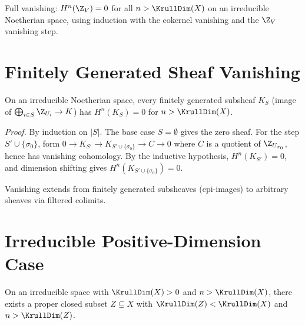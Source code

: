 \begin{theorem}\label{thm:zeroOutsideInt_cohomology_vanishing}
  \leanok
  Full vanishing: $H^n(\Z_V) = 0$ for all $n > \KrullDim(X)$ on an
  irreducible Noetherian space, using induction with the cokernel
  vanishing and the $\Z_V$ vanishing step.
\end{theorem}


\chapter{Finitely Generated Sheaf Vanishing}\label{ch:fingen}

\begin{theorem}\label{thm:finsetGeneratedSheaf_vanishing}
  \leanok
  On an irreducible Noetherian space, every finitely generated subsheaf $K_S$
  (image of $\bigoplus_{i \in S} \Z_{U_i} \to K$) has $H^n(K_S) = 0$ for
  $n > \KrullDim(X)$.

  \emph{Proof.} By induction on $|S|$. The base case $S = \emptyset$ gives the
  zero sheaf. For the step $S' \cup \{\sigma_0\}$, form
  $0 \to K_{S'} \to K_{S' \cup \{\sigma_0\}} \to C \to 0$
  where $C$ is a quotient of $\Z_{U_{\sigma_0}}$, hence has vanishing cohomology.
  By the inductive hypothesis, $H^n(K_{S'}) = 0$, and dimension shifting gives
  $H^n(K_{S' \cup \{\sigma_0\}}) = 0$.
\end{theorem}

\begin{theorem}\label{thm:directLimit_cohomology_vanishing}
  \leanok
  Vanishing extends from finitely generated subsheaves (epi-images)
  to arbitrary sheaves via filtered colimits.
\end{theorem}


\chapter{Irreducible Positive-Dimension Case}\label{ch:irredpos}

\begin{lemma}\label{lem:exists_closed_subset}
  \leanok
  On an irreducible space with $\KrullDim(X) > 0$ and $n > \KrullDim(X)$,
  there exists a proper closed subset $Z \subsetneq X$ with $\KrullDim(Z) < \KrullDim(X)$
  and $n > \KrullDim(Z)$.
\end{lemma}

